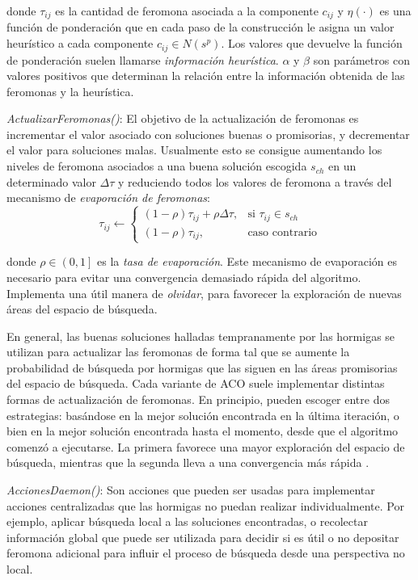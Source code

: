 \documentclass{llncs}
\begin{document}
	donde $\tau_{ij}$ es la cantidad de feromona asociada a la componente $c_{ij}$ y $\eta(\cdot)$
	es una función de ponderación que en cada paso de la construcción le asigna un valor heurístico a cada componente $c_{ij} \in N(s^p)$. Los valores que devuelve la función de ponderación suelen llamarse \textit{información heurística}. $\alpha$ y $\beta$ son parámetros con valores positivos que determinan la relación entre la información obtenida de las feromonas y la heurística.
	\bigbreak
	
	\textit{ActualizarFeromonas()}: El objetivo de la actualización de feromonas es incrementar el valor asociado con soluciones buenas o promisorias, y decrementar el valor para soluciones malas. Usualmente esto se consigue aumentando los niveles de feromona asociados a una buena solución escogida $s_{ch}$ en un determinado valor $\Delta\tau$ y reduciendo todos los valores de feromona a través del mecanismo de \textit{evaporación de feromonas}:
	\begin{equation*}
		\tau_{ij} \gets
		\begin{cases}
		(1 - \rho) \tau_{ij} + \rho\Delta\tau,& \text{si } \tau_{ij}\in s_{ch}\\
		(1 - \rho) \tau_{ij},              & \text{caso contrario}
		\end{cases}
	\end{equation*} 
	
	donde $\rho \in \left(0,1\right]$ es la \textit{tasa de evaporación}. Este mecanismo de evaporación es necesario para evitar una convergencia demasiado rápida del algoritmo. Implementa una útil manera de \textit{olvidar}, para favorecer la exploración de nuevas áreas del espacio de búsqueda.
	
	En general, las buenas soluciones halladas tempranamente por las hormigas se utilizan para actualizar las feromonas de forma tal que se aumente la probabilidad de búsqueda por hormigas que las siguen en las áreas promisorias del espacio de búsqueda. Cada variante de ACO suele implementar distintas formas de actualización de feromonas. En principio, pueden escoger entre dos estrategias: basándose en la mejor solución encontrada en la última iteración, o bien en la mejor solución encontrada hasta el momento, desde que el algoritmo comenzó a ejecutarse. La primera favorece una mayor exploración del espacio de búsqueda, mientras que la segunda lleva a una convergencia más rápida \cite{stu:dor}.
	\bigbreak
	
	\textit{AccionesDaemon()}: Son acciones que pueden ser usadas para implementar acciones centralizadas que las hormigas no puedan realizar individualmente. Por ejemplo, aplicar búsqueda local a las soluciones encontradas, o recolectar información global que puede ser utilizada para decidir si es útil o no depositar feromona adicional para influir el proceso de búsqueda desde una perspectiva no local.
\end{document}
